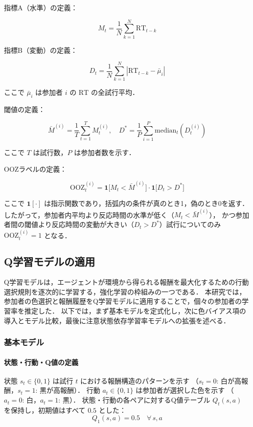 \documentclass[dvipdfmx]{jsarticle}
\begin{document}
指標A（水準）の定義：

$$M_t = \frac{1}{N}\sum_{k=1}^{N} \text{RT}_{t-k}$$

指標B（変動）の定義：

$$D_t = \frac{1}{N}\sum_{k=1}^{N} \left|\text{RT}_{t-k} - \bar{\mu}_i\right|$$

ここで $\bar{\mu}_i$ は参加者 $i$ の $\text{RT}$ の全試行平均．

閾値の定義：

$$\bar{M}^{(i)} = \frac{1}{T}\sum_{t=1}^T M_t^{(i)}, \quad D^* = \frac{1}{P}\sum_{i=1}^P \text{median}_t\left(D_t^{(i)}\right)$$

ここで $T$ は試行数，$P$ は参加者数を示す．

OOZラベルの定義：

$$\text{OOZ}_{t}^{(i)} = \mathbf{1}\big[ M_t < \bar{M}^{(i)}\big] \cdot \mathbf{1}\big[D_t > D^*\big]$$

ここで $\mathbf{1}[\cdot]$ は指示関数であり，括弧内の条件が真のとき1，偽のとき0を返す．
したがって，参加者内平均より反応時間の水準が低く（$M_t < \bar{M}^{(i)}$），
かつ参加者間の閾値より反応時間の変動が大きい（$D_t > D^*$）試行についてのみ
$\text{OOZ}_{t}^{(i)} = 1$ となる．

\subsection{Q学習モデルの適用}
Q学習モデルは，エージェントが環境から得られる報酬を最大化するための行動選択規則を逐次的に学習する，強化学習の枠組みの一つである．
本研究では，参加者の色選択と報酬履歴をQ学習モデルに適用することで，個々の参加者の学習率を推定した．
以下では，まず基本モデルを定式化し，次に色バイアス項の導入とモデル比較，最後に注意状態依存学習率モデルへの拡張を述べる．

\subsubsection{基本モデル}

\paragraph{状態・行動・Q値の定義}
状態 $s_t \in \{0, 1\}$ は試行 $t$ における報酬構造のパターンを示す
（$s_t = 0$: 白が高報酬，$s_t = 1$: 黒が高報酬）．
行動 $a_t \in \{0, 1\}$ は参加者が選択した色を示す
（$a_t = 0$: 白，$a_t = 1$: 黒）．
状態・行動の各ペアに対するQ値テーブル $Q_t(s, a)$ を保持し，初期値はすべて $0.5$ とした：
\begin{equation}
    Q_1(s, a) = 0.5 \quad \forall\, s, a
\end{equation}
\end{document}
